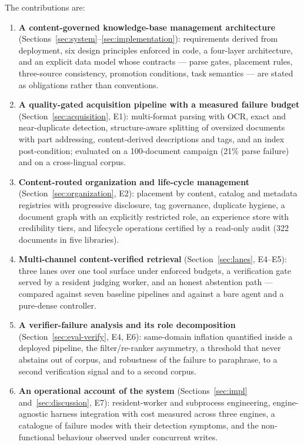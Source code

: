 \noindent The contributions are:
\begin{enumerate}
\item \textbf{A content-governed knowledge-base management architecture}
(Sections~\ref{sec:system}--\ref{sec:implementation}): requirements derived
from deployment, six design principles enforced in code, a four-layer
architecture, and an explicit data model whose contracts --- parse gates,
placement rules, three-source consistency, promotion conditions, task
semantics --- are stated as obligations rather than conventions.
\item \textbf{A quality-gated acquisition pipeline with a measured failure
budget} (Section~\ref{sec:acquisition}, E1): multi-format parsing with OCR,
exact and near-duplicate detection, structure-aware splitting of oversized
documents with part addressing, content-derived descriptions and tags, and an
index post-condition; evaluated on a 100-document campaign (21\% parse
failure) and on a cross-lingual corpus.
\item \textbf{Content-routed organization and life-cycle management}
(Section~\ref{sec:organization}, E2): placement by content, catalog and
metadata registries with progressive disclosure, tag governance, duplicate
hygiene, a document graph with an explicitly restricted role, an experience
store with credibility tiers, and lifecycle operations certified by a
read-only audit (322 documents in five libraries).
\item \textbf{Multi-channel content-verified retrieval} (Section~\ref{sec:lanes},
E4--E5): three lanes over one tool surface under enforced budgets, a
verification gate served by a resident judging worker, and an honest
abstention path --- compared against seven baseline pipelines and against a
bare agent and a pure-dense controller.
\item \textbf{A verifier-failure analysis and its role decomposition}
(Section~\ref{sec:eval-verify}, E4, E6): same-domain inflation quantified
inside a deployed pipeline, the filter/re-ranker asymmetry, a threshold that
never abstains out of corpus, and robustness of the failure to paraphrase, to
a second verification signal and to a second corpus.
\item \textbf{An operational account of the system} (Sections~\ref{sec:impl}
and~\ref{sec:discussion}, E7): resident-worker and subprocess engineering,
engine-agnostic harness integration with cost measured across three engines,
a catalogue of failure modes with their detection symptoms, and the
non-functional behaviour observed under concurrent writes.
\end{enumerate}

